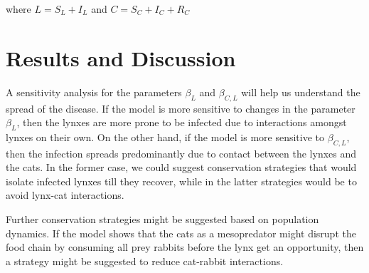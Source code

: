 \documentclass{article}
\begin{document}
where $L = S_{L} + I_{L}$ and $C = S_{C} + I_{C} + R_{C}$

\section{Results and Discussion}

\quad A sensitivity analysis for the parameters $\beta_L$ and $\beta_{C,L}$ will help us understand the spread of the disease. If the model is more sensitive to changes in the parameter $\beta_L$, then the lynxes are more prone to be infected due to interactions amongst lynxes on their own. On the other hand, if the model is more sensitive to $\beta_{C,L}$, then the infection spreads predominantly due to contact between the lynxes and the cats. In the former case, we could suggest conservation strategies that would isolate infected lynxes till they recover, while in the latter strategies would be to avoid lynx-cat interactions. 

\quad Further conservation strategies might be suggested based on population dynamics. If the model shows that the cats as a mesopredator might disrupt the food chain by consuming all prey rabbits before the lynx get an opportunity, then a strategy might be suggested to reduce cat-rabbit interactions. 


\printbibliography
\end{document}
